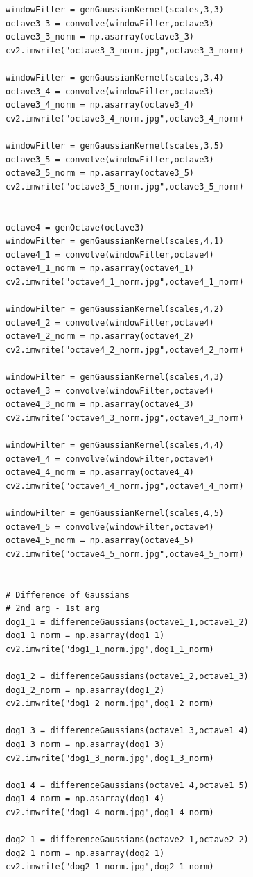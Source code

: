 \documentclass[12pt]{article}
\newenvironment{QandA}
{
	\begin{enumerate}[label=\normalfont\arabic*.,leftmargin=2em,rightmargin=2em]\normalfont
	}
	{
	\end{enumerate}
}
\newenvironment{codelalala}{}{}
\newenvironment{answered}{\setlength{\parindent}{1em}\par\normalfont}{}
\begin{document}
\begin{QandA}
\begin{answered}
\begin{codelalala}
\begin{verbatim}
windowFilter = genGaussianKernel(scales,3,3)
octave3_3 = convolve(windowFilter,octave3)
octave3_3_norm = np.asarray(octave3_3)
cv2.imwrite("octave3_3_norm.jpg",octave3_3_norm)

windowFilter = genGaussianKernel(scales,3,4)
octave3_4 = convolve(windowFilter,octave3)
octave3_4_norm = np.asarray(octave3_4)
cv2.imwrite("octave3_4_norm.jpg",octave3_4_norm)

windowFilter = genGaussianKernel(scales,3,5)
octave3_5 = convolve(windowFilter,octave3)
octave3_5_norm = np.asarray(octave3_5)
cv2.imwrite("octave3_5_norm.jpg",octave3_5_norm)


octave4 = genOctave(octave3)
windowFilter = genGaussianKernel(scales,4,1)
octave4_1 = convolve(windowFilter,octave4)
octave4_1_norm = np.asarray(octave4_1)
cv2.imwrite("octave4_1_norm.jpg",octave4_1_norm)

windowFilter = genGaussianKernel(scales,4,2)
octave4_2 = convolve(windowFilter,octave4)
octave4_2_norm = np.asarray(octave4_2)
cv2.imwrite("octave4_2_norm.jpg",octave4_2_norm)

windowFilter = genGaussianKernel(scales,4,3)
octave4_3 = convolve(windowFilter,octave4)
octave4_3_norm = np.asarray(octave4_3)
cv2.imwrite("octave4_3_norm.jpg",octave4_3_norm)

windowFilter = genGaussianKernel(scales,4,4)
octave4_4 = convolve(windowFilter,octave4)
octave4_4_norm = np.asarray(octave4_4)
cv2.imwrite("octave4_4_norm.jpg",octave4_4_norm)

windowFilter = genGaussianKernel(scales,4,5)
octave4_5 = convolve(windowFilter,octave4)
octave4_5_norm = np.asarray(octave4_5)
cv2.imwrite("octave4_5_norm.jpg",octave4_5_norm)


# Difference of Gaussians
# 2nd arg - 1st arg
dog1_1 = differenceGaussians(octave1_1,octave1_2)
dog1_1_norm = np.asarray(dog1_1)
cv2.imwrite("dog1_1_norm.jpg",dog1_1_norm)

dog1_2 = differenceGaussians(octave1_2,octave1_3)
dog1_2_norm = np.asarray(dog1_2)
cv2.imwrite("dog1_2_norm.jpg",dog1_2_norm)

dog1_3 = differenceGaussians(octave1_3,octave1_4)
dog1_3_norm = np.asarray(dog1_3)
cv2.imwrite("dog1_3_norm.jpg",dog1_3_norm)

dog1_4 = differenceGaussians(octave1_4,octave1_5)
dog1_4_norm = np.asarray(dog1_4)
cv2.imwrite("dog1_4_norm.jpg",dog1_4_norm)

dog2_1 = differenceGaussians(octave2_1,octave2_2)
dog2_1_norm = np.asarray(dog2_1)
cv2.imwrite("dog2_1_norm.jpg",dog2_1_norm)


\end{verbatim}
\end{codelalala}
\end{answered}
\end{QandA}
\end{document}
